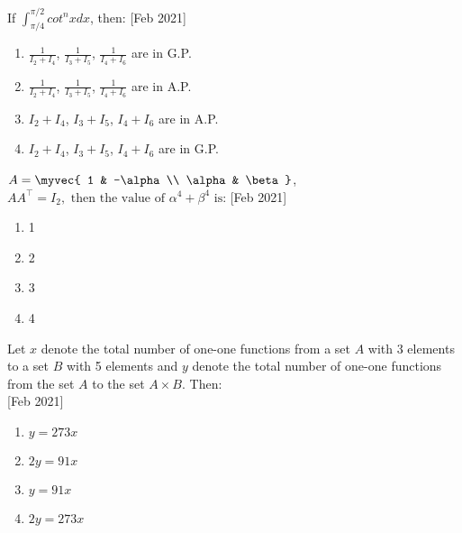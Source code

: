     \item{
     
            If $\int_{\pi/4}^{\pi/2}cot^nx dx$, then:\hfill
                {[Feb 2021]}
            \begin{multicols}{2}
                \begin{enumerate}
                    \item $\frac{1}{I_2 + I_4}$, $\frac{1}{I_3 + I_5}$, $\frac{1}{I_4 + I_6}$ are in G.P.
                    
                    \item $\frac{1}{I_2 + I_4}$, $\frac{1}{I_3 + I_5}$, $\frac{1}{I_4 + I_6}$ are in A.P.
                    
                    \item $I_2 + I_4$, $I_3 + I_5$, $I_4 + I_6$ are in A.P.
                    
                    \item $I_2 + I_4$, $I_3 + I_5$, $I_4 + I_6$ are in G.P.
                \end{enumerate}
            \end{multicols}
        
        }
    \item{
            $A = \myvec{ 1 & -\alpha \\ \alpha & \beta}$, $ AA^\top = I_2, \text{ then the value of } \alpha^4 + \beta^4 \text{ is:} $
           	\hfill
                {[Feb 2021]}
            
            \begin{multicols}{4}
				\begin{enumerate}
					\item 1
					\item 2
					\item 3
					\item 4
				\end{enumerate}
			\end{multicols}
        
        }
 	\item{
        	Let $x$ denote the total number of one-one functions from a set $A$ with 3 elements to a set $B$ with 5 elements and $y$ denote the total number of one-one functions from the set $A$ to the set $A \times B$. Then:\\ \text{ }
        	\hfill
        	{[Feb 2021]}
        	
        	\begin{multicols}{4}
        		\begin{enumerate}
					\item $y = 273x$
					
					\item $2y = 91x$
					
					\item $y = 91x$
					
					\item $2y = 273x$
        		\end{enumerate}
        	\end{multicols}
        	
        }
